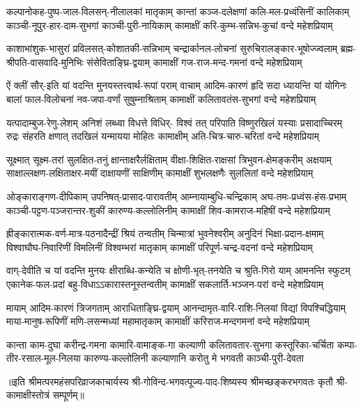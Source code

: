 
\setlength{\shlokaspaceskip}{16pt}
\fourlineindentedshloka
{कल्पानोकह-पुष्प-जाल-विलसन्-नीलालकां मातृकाम्}
{कान्तां कञ्ज-दलेक्षणां कलि-मल-प्रध्वंसिनीं कालिकाम्}
{काञ्ची-नूपुर-हार-दाम-सुभगां काञ्ची-पुरी-नायिकाम्}
{कामाक्षीं करि-कुम्भ-सन्निभ-कुचां वन्दे महेशप्रियाम्}%

\fourlineindentedshloka
{काशाभांशुक-भासुरां प्रविलसत्-कोशातकी-सन्निभाम्}
{चन्द्रार्कानल-लोचनां सुरुचिरालङ्कार-भूषोज्ज्वलाम्}
{ब्रह्म-श्रीपति-वासवादि-मुनिभिः संसेविताङ्घ्रि-द्वयाम्}
{कामाक्षीं गज-राज-मन्द-गमनां वन्दे महेशप्रियाम्}%

\fourlineindentedshloka
{ऐं क्लीं सौर्-इति यां वदन्ति मुनयस्तत्त्वार्थ-रूपां पराम्}
{वाचाम् आदिम-कारणं हृदि सदा ध्यायन्ति यां योगिनः}
{बालां फाल-विलोचनां नव-जपा-वर्णां सुषुम्नाश्रिताम्}
{कामाक्षीं कलितावतंस-सुभगां वन्दे महेशप्रियाम्}%

\fourlineindentedshloka
{यत्पादाम्बुज-रेणु-लेशम् अनिशं लब्ध्वा विधत्ते विधिर्-}
{विश्वं तत् परिपाति विष्णुरखिलं यस्याः प्रसादाच्चिरम्}
{रुद्रः संहरति क्षणात् तदखिलं यन्मायया मोहितः}
{कामाक्षीम् अति-चित्र-चारु-चरितां वन्दे महेशप्रियाम्}%

\fourlineindentedshloka
{सूक्ष्मात् सूक्ष्म-तरां सुलक्षित-तनुं क्षान्ताक्षरैर्लक्षिताम्}
{वीक्षा-शिक्षित-राक्षसां त्रिभुवन-क्षेमङ्करीम् अक्षयाम्}
{साक्षाल्लक्षण-लक्षिताक्षर-मयीं दाक्षायणीं साक्षिणीम्}
{कामाक्षीं शुभलक्षणैः सुललितां वन्दे महेशप्रियाम्}%

\fourlineindentedshloka
{ओङ्काराङ्गण-दीपिकाम् उपनिषत्-प्रासाद-पारावतीम्}
{आम्नायाम्बुधि-चन्द्रिकाम् अघ-तमः-प्रध्वंस-हंस-प्रभाम्}
{काञ्ची-पट्टण-पञ्जरान्तर-शुकीं कारुण्य-कल्लोलिनीम्}
{कामाक्षीं शिव-कामराज-महिषीं वन्दे महेशप्रियाम्}%

\fourlineindentedshloka
{ह्रीङ्कारात्मक-वर्ण-मात्र-पठनादैन्द्रीं श्रियं तन्वतीम्}
{चिन्मात्रां भुवनेश्वरीम् अनुदिनं भिक्षा-प्रदान-क्षमाम्}
{विश्वाघौघ-निवारिणीं विमलिनीं विश्वम्भरां मातृकाम्}
{कामाक्षीं परिपूर्ण-चन्द्र-वदनां वन्दे महेशप्रियाम्}%

\fourlineindentedshloka
{वाग्-देवीति च यां वदन्ति मुनयः क्षीराब्धि-कन्येति च}
{क्षोणी-भृत्-तनयेति च श्रुति-गिरो याम् आमनन्ति स्फुटम्}
{एकानेक-फल-प्रदां बहु-विधाऽऽकारास्तनूस्तन्वतीम्}
{कामाक्षीं सकलार्ति-भञ्जन-परां वन्दे महेशप्रियाम्}%

\fourlineindentedshloka
{मायाम् आदिम-कारणं त्रिजगताम् आराधिताङ्घ्रि-द्वयाम्}
{आनन्दामृत-वारि-राशि-निलयां विद्यां विपश्चिद्धियाम्}
{माया-मानुष-रूपिणीं मणि-लसन्मध्यां महामातृकाम्}
{कामाक्षीं करिराज-मन्दगमनां वन्दे महेशप्रियाम्}%

\fourlineindentedshloka
{कान्ता काम-दुघा करीन्द्र-गमना कामारि-वामाङ्क-गा}
{कल्याणी कलितावतार-सुभगा कस्तूरिका-चर्चिता}
{कम्पा-तीर-रसाल-मूल-निलया कारुण्य-कल्लोलिनी}
{कल्याणानि करोतु मे भगवती काञ्ची-पुरी-देवता}%

{॥इति श्रीमत्परमहंसपरिव्राजकाचार्यस्य श्री-गोविन्द-भगवत्पूज्य-पाद-शिष्यस्य 
श्रीमच्छङ्करभगवतः कृतौ श्री-कामाक्षीस्तोत्रं सम्पूर्णम्॥}
\setlength{\shlokaspaceskip}{24pt}

